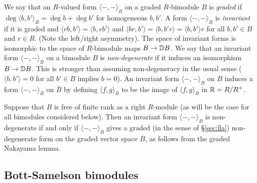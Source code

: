 \documentclass[11pt]{amsart}
\numberwithin{equation}{section}
\def\to{\rightarrow}
\theoremstyle{definition}
\theoremstyle{remark}
\begin{document}
We say that an $R$-valued form $\langle -, - \rangle_B$ on a graded
$R$-bimodule $B$ is \emph{graded} if $\deg \langle b, b' \rangle_B =
\deg b + \deg b'$ for homogeneous $b,b'$. A form $\langle -, -
\rangle_B$ is \emph{invariant} if it is graded and $\langle r b, b' \rangle = \langle b, rb' \rangle$ and $\langle br, b' \rangle = \langle b, b'r \rangle = \langle b, b'
\rangle r$ for all $b, b' \in B$ and $r \in R$. (Note the left/right asymmetry).
The space of invariant forms is
isomorphic to the space of $R$-bimodule maps $B \to \DM B$.
We say that an invariant form $\langle -, - \rangle_B$ on a bimodule $B$
is \emph{non-degenerate} if it induces an isomorphism $B \to \DM
B$. This is stronger than assuming non-degeneracy in the usual sense ($\langle b, b'
\rangle = 0$ for all $b' \in B$ implies $b = 0$). An invariant
form $\langle -, - \rangle_B$ on $B$ induces a form $\langle - , -
\rangle_{\overline{B}}$ on $\overline{B}$ by defining $\langle f, g
\rangle_{\overline{B}}$ to be the image of $\langle f, g \rangle_B$ in
${\mathbb{R}} = R/R^+$.

Suppose that $B$ is free of finite rank as a right $R$-module (as will be the case
for all bimodules considered below). Then  an invariant form
$\langle -, - \rangle_B$ is non-degenerate if and only if $\langle -,
- \rangle_{\overline{B}}$ gives a graded (in the sense of \S\ref{sec:lla}) non-degenerate form on the graded
vector space $\overline{B}$, as follows from the graded Nakayama lemma.

\subsection{Bott-Samelson bimodules} \label{sec:BSbimodules}
\end{document}
